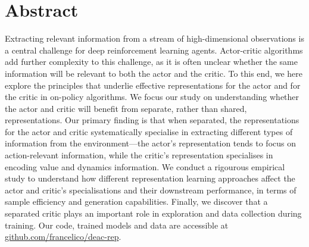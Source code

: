 \section{Abstract}
Extracting relevant information from a stream of high-dimensional observations is a central challenge for deep reinforcement learning agents. Actor-critic algorithms add further complexity to this challenge, as it is often unclear whether the same information will be relevant to both the actor and the critic. To this end, we here explore the principles that underlie effective representations for the actor and for the critic in on-policy algorithms. We focus our study on understanding whether the actor and critic will benefit from separate, rather than shared, representations. 
Our primary finding is that when separated, the representations for the actor and critic systematically specialise in extracting different types of information from the environment---the actor's representation tends to focus on action-relevant information, while the critic's representation specialises in encoding value and dynamics information. We conduct a rigourous empirical study to understand how different representation learning approaches affect the actor and critic's specialisations and their downstream performance, in terms of sample efficiency and generation capabilities. Finally, we discover that a separated critic plays an important role in exploration and data collection during training. Our code, trained models and data are accessible at \href{https://github.com/francelico/deac-rep}{github.com/francelico/deac-rep}.
%

